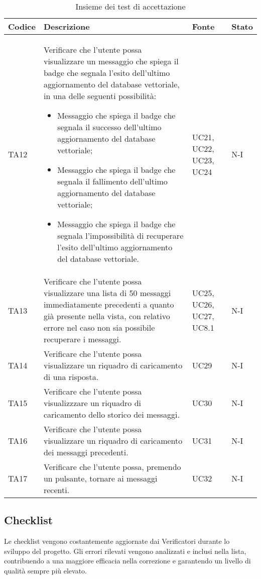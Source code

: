 \begin{table}[h!]
    \centering
    \renewcommand{\arraystretch}{1.5} %
    \begin{tabularx}{\textwidth}{|p{}|X|p{}|p{}|}\hline
    \rowcolor[HTML]{FFD700}
    \textbf{Codice} & \textbf{Descrizione} & \textbf{Fonte} & \textbf{Stato} \\ \hline
    TA12 & Verificare che l'utente possa visualizzare un messaggio che spiega il badge che segnala l'esito dell'ultimo aggiornamento del database vettoriale, in una delle seguenti possibilità:
    \begin{itemize}
        \item Messaggio che spiega il badge che segnala il successo dell'ultimo aggiornamento del database vettoriale;
        \item Messaggio che spiega il badge che segnala il fallimento dell'ultimo aggiornamento del database vettoriale;
        \item Messaggio che spiega il badge che segnala l'impossibilità di recuperare l'esito dell'ultimo aggiornamento del database vettoriale.
    \end{itemize} 
    & UC21, UC22, UC23, UC24 & N-I \\ \hline
    TA13 & Verificare che l'utente possa visualizzare una lista di 50 messaggi immediatamente precedenti a quanto già presente nella vista, con relativo errore nel caso non sia possibile recuperare i messaggi. & UC25, UC26, UC27, UC8.1 & N-I \\ \hline
    TA14 & Verificare che l'utente possa visualizzare un riquadro di caricamento di una risposta.& UC29 & N-I \\ \hline
    TA15 & Verificare che l'utente possa visualizzzare un riquadro di caricamento dello storico dei messaggi. & UC30 & N-I \\ \hline
    TA16 & Verificare che l'utente possa visualizzare un riquadro di caricamento dei messaggi precedenti. & UC31 & N-I \\ \hline
    TA17 & Verificare che l'utente possa, premendo un pulsante, tornare ai messaggi recenti. & UC32 & N-I \\ \hline

    \end{tabularx}
    \caption{Insieme dei test di accettazione}
\end{table}

\newpage

\subsection{Checklist}
\label{sec:checklist}
Le checklist vengono costantemente aggiornate dai Verificatori durante lo sviluppo del progetto. Gli errori rilevati vengono analizzati e inclusi nella lista, contribuendo a una maggiore efficacia nella correzione e garantendo un livello di qualità sempre più elevato.

